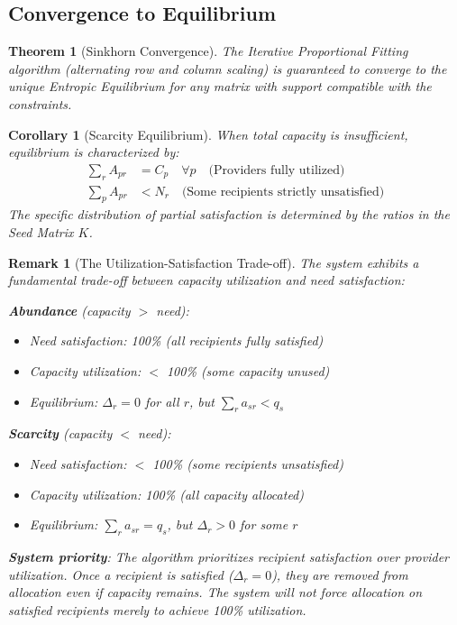 \documentclass[11pt]{article}
\newtheorem{theorem}{Theorem}
\newtheorem{corollary}{Corollary}
\newtheorem{remark}{Remark}
\begin{document}
\subsection{Convergence to Equilibrium}

\begin{theorem}[Sinkhorn Convergence]
The Iterative Proportional Fitting algorithm (alternating row and column scaling) is guaranteed to converge to the unique Entropic Equilibrium for any matrix with support compatible with the constraints.
\end{theorem}

\begin{corollary}[Scarcity Equilibrium]
\label{cor:scarcity-equilibrium}
When total capacity is insufficient, equilibrium is characterized by:
\begin{align}
\sum_r A_{pr} &= C_p \quad \forall p \quad \text{(Providers fully utilized)} \\
\sum_p A_{pr} &< N_r \quad \text{(Some recipients strictly unsatisfied)}
\end{align}
The specific distribution of partial satisfaction is determined by the ratios in the Seed Matrix $K$.
\end{corollary}


\begin{remark}[The Utilization-Satisfaction Trade-off]
The system exhibits a fundamental trade-off between capacity utilization and need satisfaction:

\textbf{Abundance} (capacity $>$ need):
\begin{itemize}
\item[\(\checkmark\)] Need satisfaction: 100\% (all recipients fully satisfied)
\item[\(\times\)] Capacity utilization: $<$ 100\% (some capacity unused)
\item Equilibrium: $\Delta_r = 0$ for all $r$, but $\sum_r a_{sr} < q_s$
\end{itemize}

\textbf{Scarcity} (capacity $<$ need):
\begin{itemize}
\item[\(\times\)] Need satisfaction: $<$ 100\% (some recipients unsatisfied)
\item[\(\checkmark\)] Capacity utilization: 100\% (all capacity allocated)
\item Equilibrium: $\sum_r a_{sr} = q_s$, but $\Delta_r > 0$ for some $r$
\end{itemize}

\textbf{System priority}: The algorithm prioritizes recipient satisfaction over provider utilization. Once a recipient is satisfied ($\Delta_r = 0$), they are removed from allocation even if capacity remains. The system will not force allocation on satisfied recipients merely to achieve 100\% utilization.
\end{remark}
\end{document}
